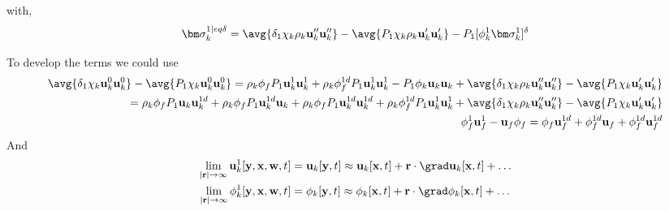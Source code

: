 with, 
\begin{equation*}
    \bm\sigma_k^{1|eq\delta} 
    = 
    \avg{\delta_1 \chi_k \rho_k \textbf{u}_k''  \textbf{u}_k'' }
    - \avg{P_1 \chi_k\rho_k \textbf{u}_k'\textbf{u}_k'}
    - P_1 [\phi_k^1 \bm\sigma_k^1]^\delta
\end{equation*}

To develop the terms we could use 
\begin{align*}
    \avg{\delta_1 \chi_k \textbf{u}_k^0\textbf{u}_k^0}
    - \avg{P_1 \chi_k \textbf{u}_k^0\textbf{u}_k^0}
    = 
    \rho_k \phi_f P_1 \textbf{u}_k^1 \textbf{u}_k^1
    + \rho_k \phi_f^{1d} P_1 \textbf{u}_k^1 \textbf{u}_k^1
    - P_1 \phi_k \textbf{u}_k \textbf{u}_k
    + \avg{\delta_1 \chi_k \rho_k \textbf{u}_k''  \textbf{u}_k'' }
    - \avg{P_1 \chi_k \textbf{u}_k'\textbf{u}_k'}\\
    = 
    \rho_k \phi_f P_1 \textbf{u}_k \textbf{u}_k^{1d}
    + \rho_k \phi_f P_1 \textbf{u}_k^{1d} \textbf{u}_k
    + \rho_k \phi_f P_1 \textbf{u}_k^{1d} \textbf{u}_k^{1d}
    + \rho_k \phi_f^{1d} P_1 \textbf{u}_k^1 \textbf{u}_k^1
    + \avg{\delta_1 \chi_k \rho_k \textbf{u}_k''  \textbf{u}_k'' }
    - \avg{P_1 \chi_k \textbf{u}_k'\textbf{u}_k'}\\
    \phi_f^1 \textbf{u}_f^1 - \textbf{u}_f\phi_f 
    =
    \phi_f \textbf{u}_f^{1d} 
    + \phi_f^{1d} \textbf{u}_f 
    + \phi_f^{1d} \textbf{u}_f^{1d} 
\end{align*}
And 
\begin{align}
    \lim_{|\textbf{r}| \to \infty}  \textbf{u}_k^1[\textbf{y},\textbf{x},\textbf{w},t]
    &= \textbf{u}_k[\textbf{y},t]
    \approx \textbf{u}_k[\textbf{x},t]
    + \textbf{r}\cdot \grad \textbf{u}_k[\textbf{x},t] 
    + \ldots\\
    \lim_{|\textbf{r}| \to \infty}  \phi_k^1[\textbf{y},\textbf{x},\textbf{w},t]
    &= \phi_k[\textbf{y},t]
    \approx \phi_k[\textbf{x},t]
    + \textbf{r}\cdot \grad \phi_k[\textbf{x},t] 
    + \ldots
\end{align}

